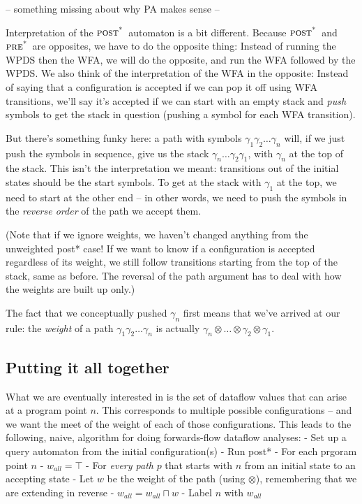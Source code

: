 \documentclass{article}
\newcommand{\meet}{\sqcap}
\newcommand{\extend}{\otimes}
\newcommand{\poststar}{\ensuremath{\textsc{post}^\textsc{*}}}
\newcommand{\prestar}{\ensuremath{\textsc{pre}^\textsc{*}}}
\begin{document}
-- something missing about why PA makes sense --

Interpretation of the \poststar\ automaton is a bit different. Because
\poststar\ and \prestar\ are opposites, we have to do the opposite thing:
Instead of running the WPDS then the WFA, we will do the opposite, and
run the WFA followed by the WPDS. We also think of the interpretation
of the WFA in the opposite: Instead of saying that a configuration is
accepted if we can pop it off using WFA transitions, we'll say it's
accepted if we can start with an empty stack and \emph{push} symbols
to get the stack in question (pushing a symbol for each WFA
transition).

But there's something funky here: a path with symbols $\gamma_1
\gamma_2 \dots \gamma_n$ will, if we just push the symbols in
sequence, give us the stack $\gamma_n \dots \gamma_2 \gamma_1$, with
$\gamma_n$ at the top of the stack. This isn't the interpretation we
meant: transitions out of the initial states should be the start
symbols. To get at the stack with $\gamma_1$ at the top, we need to
start at the other end -- in other words, we need to push the symbols
in the \emph{reverse order} of the path we accept them.

(Note that if we ignore weights, we haven't changed anything from the
unweighted post* case! If we want to know if a configuration is
accepted regardless of its weight\footnotemark, we still follow
transitions starting from the top of the stack, same as before. The
reversal of the path argument has to deal with how the weights are
built up only.)

The fact that we conceptually pushed $\gamma_n$ first means that we've
arrived at our rule: the \emph{weight} of a path $\gamma_1 \gamma_2
\dots \gamma_n$ is actually $\gamma_n \extend \dots \extend \gamma_2
\extend \gamma_1$.







\subsection{Putting it all together}

What we are eventually interested in is the set of dataflow
values that can arise at a program point $n$. This corresponds to
multiple possible configurations -- and we want the meet of the weight
of each of those configurations. This leads to the following, naive,
algorithm for doing forwards-flow dataflow analyses:
    - Set up a query automaton from the initial configuration(s)
    - Run post*
    - For each prgoram point $n$
          - $w_{all} = \top$
          - For \emph{every path} $p$ that starts with $n$ from an
            initial state to an accepting state
              - Let $w$ be the weight of the path (using $\extend$),
                remembering that we are extending in reverse
              - $w_{all} = w_{all} \meet w$
          - Label $n$ with $w_{all}$
\end{document}
